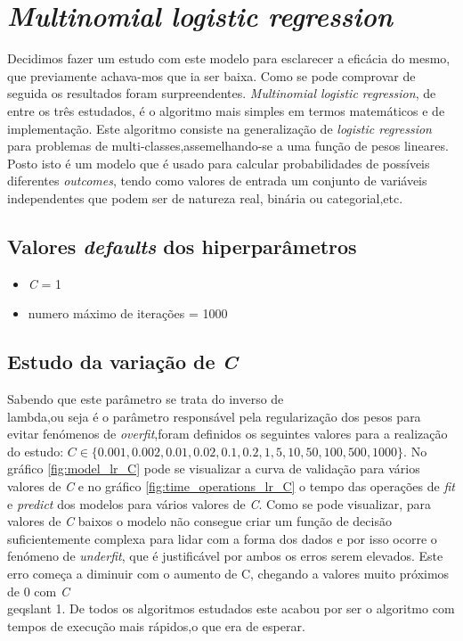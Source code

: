 \section{\textit{Multinomial logistic regression}}
Decidimos fazer um estudo com este modelo para esclarecer a eficácia do mesmo, que previamente achava-mos que ia ser baixa. Como se pode comprovar de seguida os resultados foram surpreendentes.
\textit{Multinomial logistic regression}, de entre os três estudados, é o algoritmo mais simples em termos matemáticos e de  implementação. Este algoritmo consiste na generalização de \textit{logistic regression} para problemas de multi-classes,assemelhando-se a uma função de pesos lineares. Posto isto é um modelo que é usado para calcular probabilidades de possíveis diferentes \textit{outcomes}, tendo como valores de entrada um conjunto de variáveis independentes que podem ser de natureza real, binária ou categorial,etc.

\subsection{Valores \textit{defaults} dos hiperparâmetros}

\begin{itemize}
    \item \textit{C} = 1
    \item numero máximo de iterações = 1000
\end{itemize}

\subsection{Estudo da variação de \textit{C}}
Sabendo que este parâmetro se trata do inverso de \\lambda,ou seja é o parâmetro responsável pela regularização dos pesos para evitar fenómenos de \textit{overfit},foram definidos os seguintes valores para a realização do estudo: $\textit{C} \in \{0.001, 0.002, 0.01, 0.02, 0.1, 0.2, 1, 5, 10, 50, 100, 500, 1000\}$.
No gráfico \ref{fig:model_lr_C} pode se visualizar a curva de validação para vários valores de \textit{C} e no gráfico \ref{fig:time_operations_lr_C} o tempo das operações de \textit{fit} e \textit{predict} dos modelos para vários valores de \textit{C}.
Como se pode visualizar, para valores de \textit{C} baixos o modelo não consegue criar um função de decisão suficientemente complexa para lidar com a forma dos dados e por isso ocorre o fenómeno de \textit{underfit}, que é justificável por ambos os erros serem elevados. Este erro começa a diminuir com o aumento de C, chegando a valores muito próximos de 0 com \textit{C} \\geqslant 1.
De todos os algoritmos estudados este acabou por ser o algoritmo com tempos de execução mais rápidos,o que era de esperar.

